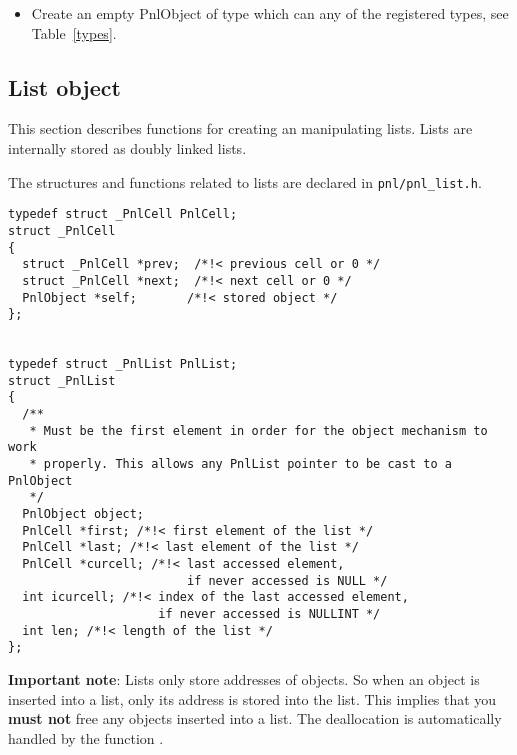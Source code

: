 \begin{itemize}
\item {}
  \sshortdescribe Create an empty PnlObject of type  which can any of
  the registered types, see Table~\ref{types}.
\end{itemize}

\subsection{List object}

This section describes functions for creating an manipulating lists. Lists are
internally stored as doubly linked lists.

The structures and functions related to lists are declared in
\verb!pnl/pnl_list.h!.

\begin{lstlisting}
typedef struct _PnlCell PnlCell;
struct _PnlCell
{
  struct _PnlCell *prev;  /*!< previous cell or 0 */
  struct _PnlCell *next;  /*!< next cell or 0 */
  PnlObject *self;       /*!< stored object */
};


typedef struct _PnlList PnlList;
struct _PnlList
{
  /**
   * Must be the first element in order for the object mechanism to work
   * properly. This allows any PnlList pointer to be cast to a PnlObject
   */
  PnlObject object; 
  PnlCell *first; /*!< first element of the list */
  PnlCell *last; /*!< last element of the list */
  PnlCell *curcell; /*!< last accessed element,
                         if never accessed is NULL */
  int icurcell; /*!< index of the last accessed element,
                     if never accessed is NULLINT */
  int len; /*!< length of the list */
};
\end{lstlisting}

\textbf{Important note}: Lists only store addresses of objects. So when an
object is inserted into a list, only its address is stored into the list. This
implies that you \textbf{must not} free any objects inserted into a list. The
deallocation is automatically handled by the function .

